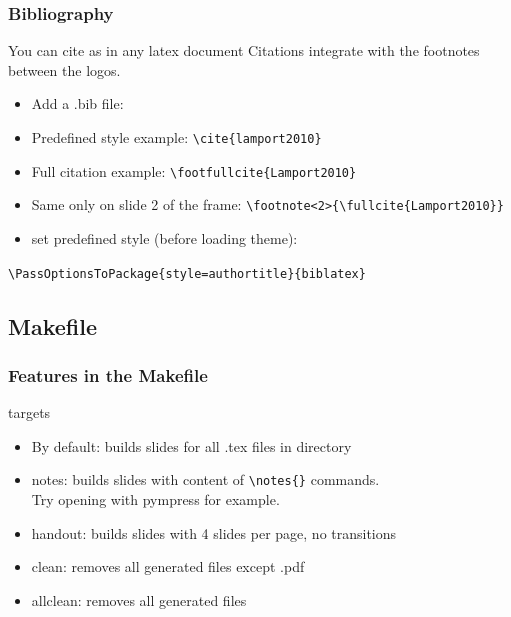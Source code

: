 \documentclass[c,12pt]{beamer}
\begin{document}
\begin{frame}[fragile]
	\frametitle{Bibliography}
	\begin{block}{You can cite as in any latex document}
		Citations integrate with the footnotes between the logos.
		\begin{itemize}
			\item Add a .bib file: \verb||
			\item Predefined style example: \verb|\cite{lamport2010}|
			\item Full citation example: \verb|\footfullcite{Lamport2010}|
			\item Same only on slide 2 of the frame: \verb|\footnote<2>{\fullcite{Lamport2010}}|
			\item set predefined style (before loading theme):
		\end{itemize}
		\verb|\PassOptionsToPackage{style=authortitle}{biblatex}|
	\end{block}
\end{frame}

\subsection[make]{Makefile}

\begin{frame}[fragile]
	\frametitle[Makefile ft.]{Features in the Makefile}
	\begin{block}{targets}
		\begin{itemize}
			\item By default: builds slides for all .tex files in directory
			\item notes: builds slides with content of \verb|\notes{}| commands.\\ Try opening with pympress for example.
			\item handout: builds slides with 4 slides per page, no transitions
			\item clean: removes all generated files except .pdf
			\item allclean: removes all generated files
		\end{itemize}
	\end{block}
\end{frame}
\end{document}
